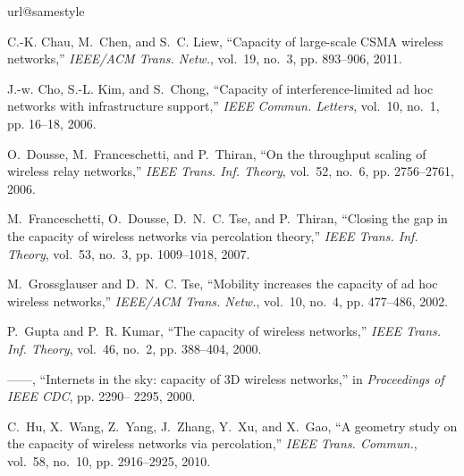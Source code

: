 \documentclass[english]{IEEEtran}
\theoremstyle{plain}
\theoremstyle{plain}
\theoremstyle{plain}
\theoremstyle{remark}
\begin{document}

\begin{thebibliography}{10}
\providecommand{\url}[1]{#1}
\csname url@samestyle\endcsname
\providecommand{\newblock}{\relax}
\providecommand{\bibinfo}[2]{#2}
\providecommand{\BIBentrySTDinterwordspacing}{\spaceskip=0pt\relax}
\providecommand{\BIBentryALTinterwordstretchfactor}{4}
\providecommand{\BIBentryALTinterwordspacing}{\spaceskip=\fontdimen2\font plus
\BIBentryALTinterwordstretchfactor\fontdimen3\font minus
  \fontdimen4\font\relax}
\providecommand{\BIBforeignlanguage}[2]{{\expandafter\ifx\csname l@#1\endcsname\relax
\typeout{** WARNING: IEEEtran.bst: No hyphenation pattern has been}\typeout{** loaded for the language `#1'. Using the pattern for}\typeout{** the default language instead.}\else
\language=\csname l@#1\endcsname
\fi
#2}}
\providecommand{\BIBdecl}{\relax}
\BIBdecl

C.-K. Chau, M.~Chen, and S.~C. Liew, ``Capacity of large-scale CSMA wireless
  networks,'' \emph{IEEE/ACM Trans. Netw.}, vol.~19, no.~3, pp. 893--906, 2011.

J.-w. Cho, S.-L. Kim, and S.~Chong, ``Capacity of interference-limited ad hoc
  networks with infrastructure support,'' \emph{IEEE Commun. Letters}, vol.~10,
  no.~1, pp. 16--18, 2006.

O.~Dousse, M.~Franceschetti, and P.~Thiran, ``On the throughput scaling of
  wireless relay networks,'' \emph{IEEE Trans. Inf. Theory}, vol.~52, no.~6,
  pp. 2756--2761, 2006.

M.~Franceschetti, O.~Dousse, D.~N.~C. Tse, and P.~Thiran, ``Closing the gap in
  the capacity of wireless networks via percolation theory,'' \emph{IEEE Trans.
  Inf. Theory}, vol.~53, no.~3, pp. 1009--1018, 2007.

M.~Grossglauser and D.~N.~C. Tse, ``Mobility increases the capacity of ad hoc
  wireless networks,'' \emph{IEEE/ACM Trans. Netw.}, vol.~10, no.~4, pp.
  477--486, 2002.

P.~Gupta and P.~R. Kumar, ``The capacity of wireless networks,'' \emph{IEEE
  Trans. Inf. Theory}, vol.~46, no.~2, pp. 388--404, 2000.

------, ``Internets in the sky: capacity of 3D wireless networks,'' in
  \emph{Proceedings of IEEE CDC}, pp. 2290-- 2295, 2000.

C.~Hu, X.~Wang, Z.~Yang, J.~Zhang, Y.~Xu, and X.~Gao, ``A geometry study on the
  capacity of wireless networks via percolation,'' \emph{IEEE Trans. Commun.},
  vol.~58, no.~10, pp. 2916--2925, 2010.


\end{thebibliography}
\end{document}
